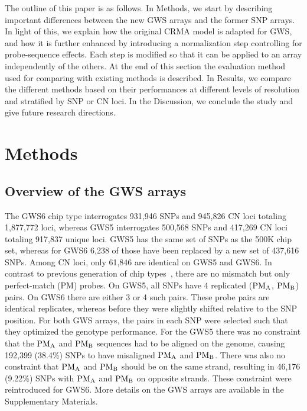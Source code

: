 \documentclass{bioinfo}
\newcommand{\GWS}{GWS\xspace}
\newcommand{\GWSFive}{GWS5\xspace}
\newcommand{\GWSSix}{GWS6\xspace}
\newcommand{\PMA}{\ensuremath{\textnormal{PM}_\textnormal{A}}\xspace}
\newcommand{\PMB}{\ensuremath{\textnormal{PM}_\textnormal{B}}\xspace}
\begin{document}
The outline of this paper is as follows. 
In Methods, we start by describing important differences between the new \GWS arrays and the former SNP arrays.  
In light of this, we explain how the original CRMA model is adapted for \GWS, and how it is further enhanced by introducing a normalization step controlling for probe-sequence effects.  
Each step is modified so that it can be applied to an array independently of the others.
At the end of this section the evaluation method used for comparing with existing methods is described.
In Results, we compare the different methods based on their performances at different levels of resolution and stratified by SNP or CN loci.
In the Discussion, we conclude the study and give future research directions.



\section{Methods}
\subsection{Overview of the \GWS arrays}

The \GWSSix chip type interrogates 931,946 SNPs and 945,826 CN loci totaling 1,877,772 loci, whereas \GWSFive interrogates 500,568 SNPs and 417,269 CN loci totaling 917,837 unique loci.  \GWSFive has the same set of SNPs as the 500K chip set, whereas for \GWSSix 6,238 of those have been replaced by a new set of 437,616 SNPs.  Among CN loci, only 61,846 are identical on \GWSFive and \GWSSix.
%
In contrast to previous generation of chip types~\citep{BengtssonH_etal_2008}, there are no  mismatch but only perfect-match (PM) probes.  
On \GWSFive, all SNPs have 4 replicated (\PMA, \PMB) pairs.  On \GWSSix there are either 3 or 4 such pairs. These probe pairs are identical replicates, whereas before they were slightly shifted relative to the SNP position.
%
For both \GWS arrays, the pairs in each SNP were selected such that they optimized the genotype performance.  For the \GWSFive there was no constraint that the \PMA and \PMB sequences had to be aligned on the genome, causing 192,399 (38.4\%) SNPs to have misaligned \PMA and \PMB.  There was also no constraint that \PMA and \PMB should be on the same strand, resulting in 46,176 (9.22\%) SNPs with \PMA and \PMB on opposite strands.  These constraint were reintroduced for \GWSSix.
More details on the \GWS arrays are available in the Supplementary Materials.
\end{document}
